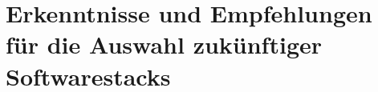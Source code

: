 \section{Erkenntnisse und Empfehlungen für die Auswahl zukünftiger Softwarestacks}\label{sec:erkenntnisse}